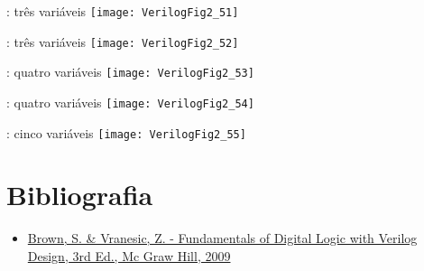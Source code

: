 \begin{frame}{\insertsection: três variáveis} \centering
    \texttt{[image: VerilogFig2\_51]}
\end{frame}

\begin{frame}{\insertsection: três variáveis} \centering
    \texttt{[image: VerilogFig2\_52]}
\end{frame}

\begin{frame}{\insertsection: quatro variáveis} \centering
    \texttt{[image: VerilogFig2\_53]}
\end{frame}

\begin{frame}{\insertsection: quatro variáveis} \centering
    \texttt{[image: VerilogFig2\_54]}
\end{frame}

\begin{frame}{\insertsection: cinco variáveis} \centering
    \texttt{[image: VerilogFig2\_55]}
\end{frame}

\section{Bibliografia} %

\begin{frame}{\insertsection} 
	\begin{itemize}
		\item \href{https://www.google.com.br/search?q=filetype\%3Apdf+Fundamentals+of+Digital+Logic+with+Verilog+Design+&oq=filetype\%3Apdf}{Brown, S. \& Vranesic, Z. - Fundamentals of Digital Logic with Verilog Design, 3rd Ed., Mc Graw Hill, 2009}
	\end{itemize}
\end{frame}

\begin{frame}
	\titlepage
\end{frame} 

